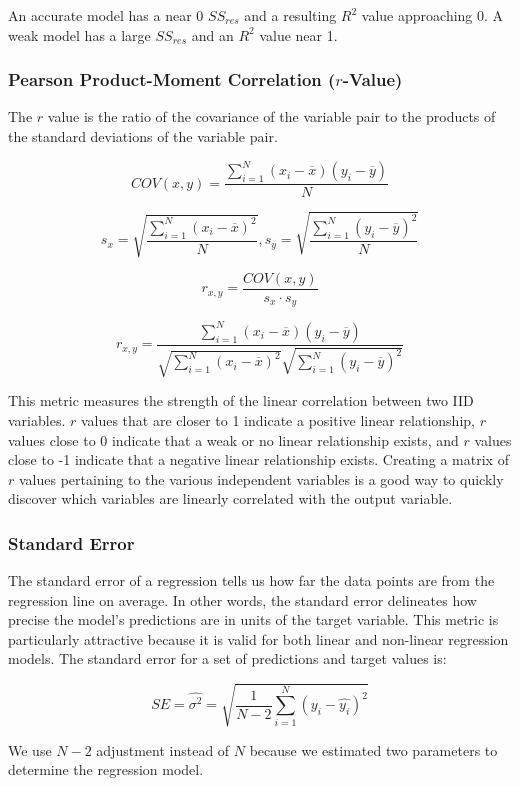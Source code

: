 \documentclass{article}
\begin{document}
\noindent
An accurate model has a near 0 $SS_{res}$ and a resulting $R^2$ value approaching 0. A weak model has a large $SS_{res}$ and an $R^2$ value near 1.

\subsubsection*{Pearson Product-Moment Correlation ($r$-Value)}
The $r$ value is the ratio of the covariance of the variable pair to the products of the standard deviations of the variable pair. 

\[COV(x, y) = \frac{\sum_{i=1}^{N}(x_i - \overline{x})(y_i - \overline{y})}{N}\]

\[s_x = \sqrt{\frac{\sum_{i=1}^{N}(x_i - \overline{x})^2}{N}}, s_y = \sqrt{\frac{\sum_{i=1}^{N}(y_i - \overline{y})^2}{N}}\]

\[r_{x, y} = \frac{COV(x, y)}{s_x \cdot s_y}\]

\[r_{x, y} = \frac{\sum_{i=1}^{N}(x_i - \overline{x})(y_i - \overline{y})}{\sqrt{\sum_{i=1}^{N}(x_i - \overline{x})^2}\sqrt{\sum_{i=1}^{N}(y_i - \overline{y})^2}}\]

\noindent
This metric measures the strength of the linear correlation between two IID variables. $r$ values that are closer to 1 indicate a positive linear relationship, $r$ values close to 0 indicate that a weak or no linear relationship exists, and $r$ values close to -1 indicate that a negative linear relationship exists. Creating a matrix of $r$ values pertaining to the various independent variables is a good way to quickly discover which variables are linearly correlated with the output variable. 

\subsubsection*{Standard Error}
The standard error of a regression tells us how far the data points are from the regression line on average. In other words, the standard error delineates how precise the model's predictions are in units of the target variable. This metric is particularly attractive because it is valid for both linear and non-linear regression models. The standard error for a set of predictions and target values is:

\[SE = \hat{\sigma^2} = \sqrt{\frac{1}{N-2}\sum_{i=1}^{N}(y_i - \hat{y_i})^2}\]

\noindent
We use $N-2$ adjustment instead of $N$ because we estimated two parameters to determine the regression model.
\end{document}

